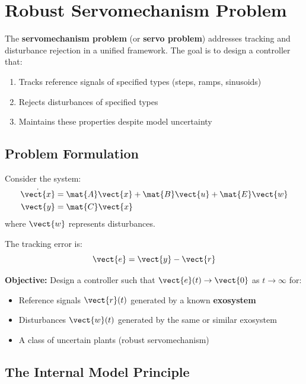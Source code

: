 \section{Robust Servomechanism Problem}
\label{sec:servomechanism}

The \textbf{servomechanism problem} (or \textbf{servo problem}) addresses tracking and disturbance rejection in a unified framework. The goal is to design a controller that:
\begin{enumerate}
    \item Tracks reference signals of specified types (steps, ramps, sinusoids)
    \item Rejects disturbances of specified types
    \item Maintains these properties despite model uncertainty
\end{enumerate}

\subsection{Problem Formulation}

Consider the system:
\begin{align}
\dot{\vect{x}} &= \mat{A}\vect{x} + \mat{B}\vect{u} + \mat{E}\vect{w} \\
\vect{y} &= \mat{C}\vect{x}
\end{align}
where $\vect{w}$ represents disturbances.

The tracking error is:
\begin{equation}
\vect{e} = \vect{y} - \vect{r}
\end{equation}

\textbf{Objective:} Design a controller such that $\vect{e}(t) \to \vect{0}$ as $t \to \infty$ for:
\begin{itemize}
    \item Reference signals $\vect{r}(t)$ generated by a known \textbf{exosystem}
    \item Disturbances $\vect{w}(t)$ generated by the same or similar exosystem
    \item A class of uncertain plants (robust servomechanism)
\end{itemize}

\subsection{The Internal Model Principle}

